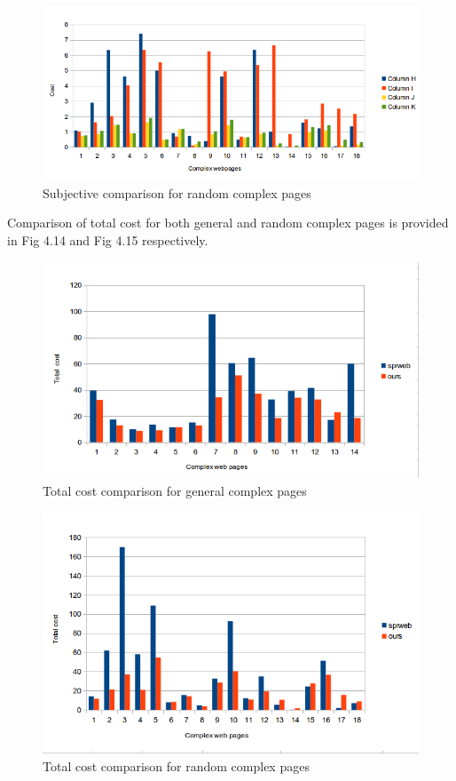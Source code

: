 \begin{figure}[!htb]
  \centering
  \includegraphics[width=\linewidth]{complexRS.png}
\caption{Subjective comparison for random complex pages}
\label{fig:test}
\end{figure}

Comparison of total cost for both general and random complex pages is provided in Fig 4.14 and Fig 4.15 respectively.

\begin{figure}[!htb]
\centering
  \includegraphics[width=\linewidth]{complexGtotal.png}
  \caption{Total cost comparison for general complex pages}
  \label{fig:sub1}
\end{figure}

\begin{figure}[!htb]
  \centering
  \includegraphics[width=\linewidth]{complexRtotal.png}
\caption{Total cost comparison for random complex pages}
\label{fig:test}
\end{figure}  

